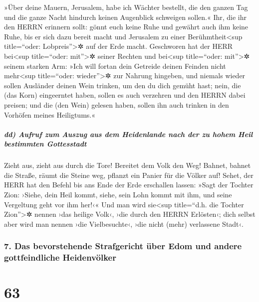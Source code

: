 »Über deine Mauern, Jerusalem, habe ich Wächter bestellt,
die den ganzen Tag und die ganze Nacht hindurch keinen Augenblick
schweigen sollen.« Ihr, die ihr den HERRN erinnern sollt: gönnt euch
keine Ruhe und gewährt auch ihm keine Ruhe, bis er sich
dazu bereit macht und Jerusalem zu einer Berühmtheit\textless sup
title=``oder: Lobpreis''\textgreater✲ auf der Erde macht.
Geschworen hat der HERR bei\textless sup title=``oder:
mit''\textgreater✲ seiner Rechten und bei\textless sup title=``oder:
mit''\textgreater✲ seinem starken Arm: »Ich will fortan dein Getreide
deinen Feinden nicht mehr\textless sup title=``oder:
wieder''\textgreater✲ zur Nahrung hingeben, und niemals wieder sollen
Ausländer deinen Wein trinken, um den du dich gemüht hast;
nein, die (das Korn) eingeerntet haben, sollen es auch
verzehren und den HERRN dabei preisen; und die (den Wein) gelesen haben,
sollen ihn auch trinken in den Vorhöfen meines Heiligtums.«

\hypertarget{dd-aufruf-zum-auszug-aus-dem-heidenlande-nach-der-zu-hohem-heil-bestimmten-gottesstadt}{%
\subparagraph{dd) Aufruf zum Auszug aus dem Heidenlande nach der zu
hohem Heil bestimmten
Gottesstadt}\label{dd-aufruf-zum-auszug-aus-dem-heidenlande-nach-der-zu-hohem-heil-bestimmten-gottesstadt}}

Zieht aus, zieht aus durch die Tore! Bereitet dem Volk
den Weg! Bahnet, bahnet die Straße, räumt die Steine weg, pflanzt ein
Panier für die Völker auf! Sehet, der HERR hat den Befehl
bis ans Ende der Erde erschallen lassen: »Sagt der Tochter Zion: ›Siehe,
dein Heil kommt, siehe, sein Lohn kommt mit ihm, und seine Vergeltung
geht vor ihm her!‹« Und man wird sie\textless sup
title=``d.h. die Tochter Zion''\textgreater✲ nennen ›das heilige Volk‹,
›die durch den HERRN Erlösten‹; dich selbst aber wird man nennen ›die
Vielbesuchte‹, ›die nicht (mehr) verlassene Stadt‹.

\hypertarget{das-bevorstehende-strafgericht-uxfcber-edom-und-andere-gottfeindliche-heidenvuxf6lker}{%
\subsubsection{7. Das bevorstehende Strafgericht über Edom und andere
gottfeindliche
Heidenvölker}\label{das-bevorstehende-strafgericht-uxfcber-edom-und-andere-gottfeindliche-heidenvuxf6lker}}

\hypertarget{section-62}{%
\section{63}\label{section-62}}

